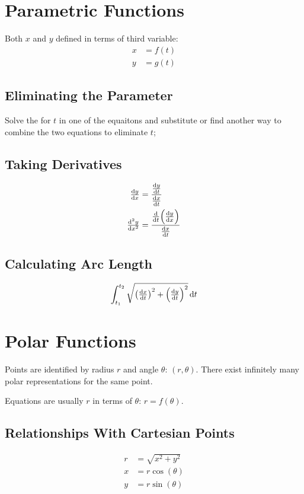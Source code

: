 \documentclass[12pt]{article}
\DeclarePairedDelimiter\paren{(}{)}
\newcommand*{\D}[1]{\mathop{}\!\mathrm{d}#1}
\newcommand*{\fixmath}{%
  \makebox{}\vspace{\glueexpr-\baselineskip-\abovedisplayskip}}
\newenvironment{fixaskip}{\setlength{\abovedisplayskip}{0pt}\fixmath%
  \ignorespaces}{\ignorespacesafterend}
\newenvironment{fixskip}{\setlength{\abovedisplayskip}{0pt}%
  \setlength{\belowdisplayskip}{0pt}\fixmath\ignorespaces}%
  {\ignorespacesafterend}
\begin{document}
\section*{Parametric Functions}
Both \(x\) and \(y\) defined in terms of third variable:
\begin{align*}
  x &= f(t)\\
  y &= g(t)
\end{align*}
\subsection*{Eliminating the Parameter}
Solve the for \(t\) in one of the equaitons and substitute or find another way
to combine the two equations to eliminate \(t\);
\subsection*{Taking Derivatives}
\begin{fixaskip}
  \begin{align*}
    \dd[y]{x} &= \frac{\dd[y]{t}}{\dd[x]{t}}\\
    \dd[2][y]{x} &= \frac{\dd{t}\paren*{\dd[y]{x}}}{\dd[x]{t}}
  \end{align*}
\end{fixaskip}
\subsection*{Calculating Arc Length}
\begin{fixskip}
  \[
    \int_{t_1}^{t_2}\sqrt{\paren*{\dd[x]{t}}^2 + \paren*{\dd[y]{t}}^2}\D{t}
  \]
\end{fixskip}
\section*{Polar Functions}
Points are identified by radius \(r\) and angle \(\theta\): \((r,\theta)\).
There exist infinitely many polar representations for the same point.

Equations are usually \(r\) in terms of \(\theta\): \(r = f(\theta)\).
\subsection*{Relationships With Cartesian Points}
\begin{fixskip}
  \begin{align*}
    r &= \sqrt{x^2+y^2}\\
    x &= r\cos(\theta)\\
    y &= r\sin(\theta)
  \end{align*}
\end{fixskip}
\end{document}
